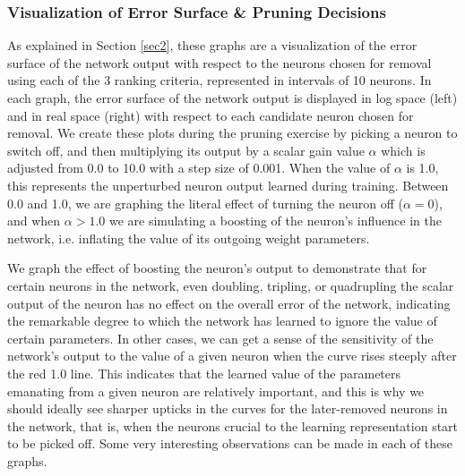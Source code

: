

\subsubsection{Visualization of Error Surface \& Pruning Decisions}

As explained in Section \ref{sec2}, these graphs are a visualization of the error surface of the network output with respect to the neurons chosen for removal using each of the 3 ranking criteria, represented in intervals of 10 neurons. In each graph, the error surface of the network output is displayed in log space (left) and in real space (right) with respect to each candidate neuron chosen for removal. We create these plots during the pruning exercise by picking a neuron to switch off, and then multiplying its output by a scalar gain value $\alpha$ which is adjusted from 0.0 to 10.0 with a step size of 0.001. When the value of $\alpha$ is 1.0, this represents the unperturbed neuron output learned during training. Between 0.0 and 1.0, we are graphing the literal effect of turning the neuron off ($\alpha = 0$), and when $\alpha > 1.0$ we are simulating a boosting of the neuron's influence in the network, i.e. inflating the value of its outgoing weight parameters. 

We graph the effect of boosting the neuron's output to demonstrate that for certain neurons in the network, even doubling, tripling, or quadrupling the scalar output of the neuron has no effect on the overall error of the network, indicating the remarkable degree to which the network has learned to ignore the value of certain parameters. In other cases, we can get a sense of the sensitivity of the network's output to the value of a given neuron when the curve rises steeply after the red 1.0 line. This indicates that the learned value of the parameters emanating from a given neuron are relatively important, and this is why we should ideally see sharper upticks in the curves for the later-removed neurons in the network, that is, when the neurons crucial to the learning representation start to be picked off. Some very interesting observations can be made in each of these graphs. 

